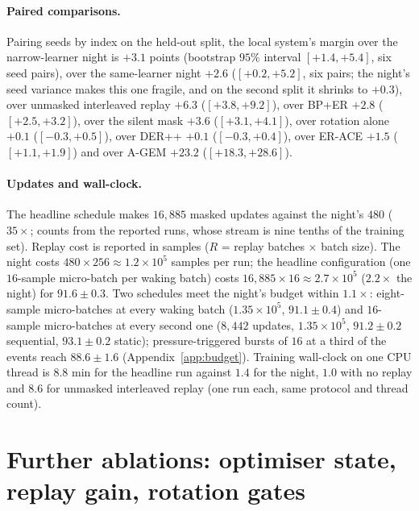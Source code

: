 \documentclass{article}
\begin{document}
\paragraph{Paired comparisons.} Pairing seeds by index on the held-out split, the local
system's margin over the narrow-learner night is $+3.1$ points (bootstrap $95\%$ interval
$[+1.4,+5.4]$, six seed pairs), over the same-learner night $+2.6$ ($[+0.2,+5.2]$, six
pairs; the night's seed variance makes this one fragile, and on the second split it shrinks
to $+0.3$), over unmasked interleaved replay $+6.3$ ($[+3.8,+9.2]$), over BP+ER $+2.8$
($[+2.5,+3.2]$), over the silent mask $+3.6$ ($[+3.1,+4.1]$), over rotation alone $+0.1$
($[-0.3,+0.5]$), over DER++ $+0.1$ ($[-0.3,+0.4]$), over ER-ACE $+1.5$ ($[+1.1,+1.9]$) and
over A-GEM $+23.2$ ($[+18.3,+28.6]$).

\paragraph{Updates and wall-clock.} The headline schedule makes $16{,}885$ masked updates
against the night's $480$ ($35\times$; counts from the reported runs, whose stream is nine
tenths of the training set). Replay cost is reported in samples ($R$ = replay batches
$\times$ batch size). The night costs $480\times256\approx1.2\times10^5$ samples per run; the
headline configuration (one $16$-sample micro-batch per waking batch) costs
$16{,}885\times16\approx2.7\times10^5$ ($2.2\times$ the night) for $91.6\pm0.3$. Two
schedules meet the night's budget within $1.1\times$: eight-sample micro-batches at every
waking batch ($1.35\times10^5$, $91.1\pm0.4$) and $16$-sample micro-batches at every second
one ($8{,}442$ updates, $1.35\times10^5$, $91.2\pm0.2$ sequential, $93.1\pm0.2$ static);
pressure-triggered bursts of $16$ at a third of the events reach $88.6\pm1.6$
(Appendix~\ref{app:budget}). Training wall-clock on one CPU thread is $8.8$ min for the
headline run against $1.4$ for the night, $1.0$ with no replay and $8.6$ for unmasked
interleaved replay (one run each, same protocol and thread count).

\section{Further ablations: optimiser state, replay gain, rotation gates}
\label{app:further}
\end{document}
